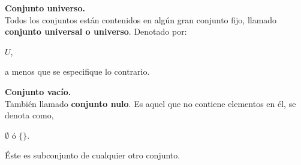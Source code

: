 
\noindent   \textbf{Conjunto universo.} \\
\noindent     Todos los conjuntos están contenidos en algún gran conjunto fijo, llamado \textbf{conjunto universal o universo}. Denotado por:
    \begin{center}
        $U$,
    \end{center}
\noindent     a menos que se especifique lo contrario.\\ \vspace{6px}
    
\noindent \textbf{Conjunto vac\'io.} \\
\noindent     Tambi\'en llamado \textbf{conjunto nulo}. Es aquel que no contiene elementos en él, se denota como, 
    \begin{center}
        $\emptyset$ \hspace{0.5cm} \'o \hspace{0.5cm} $\lbrace \rbrace$.
    \end{center}
\noindent     \'Este es subconjunto de cualquier otro conjunto. 